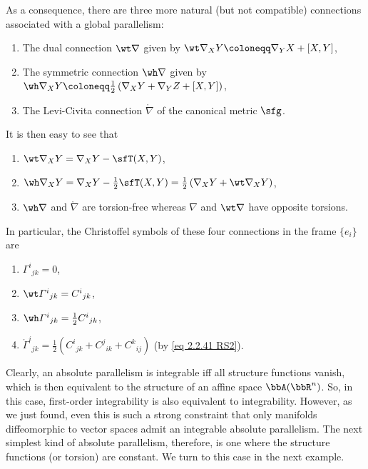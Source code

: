 \begin{example}
    As a consequence, there are three more natural (but not compatible) connections associated with a global parallelism:
    \begin{enumerate}
        \item The dual connection $\wt\nabla$ given by $\wt\nabla_X Y\coloneqq \nabla_Y X+[X,Y]$,
        \item The symmetric connection $\wh\nabla$ given by $\wh\nabla_X Y\coloneqq \frac12\left(\nabla_X Y+\nabla_Y Z+[X,Y]\right)$,
        \item The Levi-Civita connection $\mathring{\nabla}$ of the canonical metric $\sfg$.
    \end{enumerate}
    It is then easy to see that 
    \begin{enumerate}
        \item $\wt\nabla_X Y=\nabla_X Y-\sfT(X,Y)$,
        \item $\wh\nabla_X Y=\nabla_X Y-\frac12\sfT(X,Y)=\frac12\left(\nabla_X Y+\wt\nabla_X Y\right)$,
        \item $\wh\nabla$ and $\mathring{\nabla}$ are torsion-free whereas $\nabla$ and $\wt\nabla$ have opposite torsions.
    \end{enumerate}
    In particular, the Christoffel symbols of these four connections in the frame $\{e_i\}$ are 
    \begin{enumerate}
        \item $\varGamma^i{}_{jk}=0$,
        \item $\wt\varGamma^i{}_{jk}=C^i{}_{jk}$,
        \item $\wh\varGamma^i{}_{jk}=\frac12 C^i{}_{jk}$,
        \item $\mathring{\varGamma}^i{}_{jk}=\frac12\left(C^i{}_{jk}+C^j{}_{ik}+C^k{}_{ij}\right)$ (by \eqref{eq 2.2.41 RS2}).
    \end{enumerate}

    Clearly, an absolute parallelism is integrable iff all structure functions vanish, which is then equivalent to the structure of an affine space $\bbA(\bbR^n)$. So, in this case, first-order integrability is also equivalent to integrability. However, as we just found, even this is such a strong constraint that only manifolds diffeomorphic to vector spaces admit an integrable absolute parallelism. The next simplest kind of absolute parallelism, therefore, is one where the structure functions (or torsion) are constant. We turn to this case in the next example.
\end{example}


